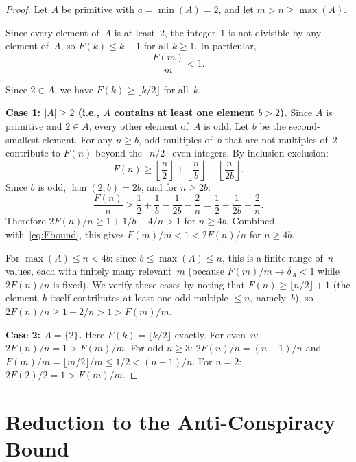 \documentclass[11pt,a4paper]{amsart}
\theoremstyle{plain}
\theoremstyle{definition}
\newcommand{\lcmop}{\operatorname{lcm}}
\begin{document}
\begin{proof}
Let $A$ be primitive with $a = \min(A) = 2$, and let $m > n \geq \max(A)$.

Since every element of~$A$ is at least~$2$, the integer~$1$ is not 
divisible by any element of~$A$, so $F(k) \leq k - 1$ for all $k \geq 1$. 
In particular,
\begin{equation}\label{eq:Fbound}
\frac{F(m)}{m} < 1.
\end{equation}

Since $2 \in A$, we have $F(k) \geq \lfloor k/2 \rfloor$ for all~$k$.

\smallskip
\noindent\textbf{Case 1: $|A| \geq 2$ (i.e., $A$ contains at least one element $b > 2$).}
Since $A$ is primitive and $2 \in A$, every other element of~$A$ is odd. 
Let $b$ be the second-smallest element. For any $n \geq b$, odd multiples 
of~$b$ that are not multiples of~$2$ contribute to $F(n)$ beyond the 
$\lfloor n/2 \rfloor$ even integers. By inclusion-exclusion:
\[
F(n) \geq \left\lfloor \frac{n}{2} \right\rfloor 
+ \left\lfloor \frac{n}{b} \right\rfloor 
- \left\lfloor \frac{n}{2b} \right\rfloor.
\]
Since $b$ is odd, $\lcmop(2,b) = 2b$, and for $n \geq 2b$:
\[
\frac{F(n)}{n} \geq \frac{1}{2} + \frac{1}{b} - \frac{1}{2b} - \frac{2}{n}
= \frac{1}{2} + \frac{1}{2b} - \frac{2}{n}.
\]
Therefore $2F(n)/n \geq 1 + 1/b - 4/n > 1$ for $n \geq 4b$. 
Combined with~\eqref{eq:Fbound}, this gives $F(m)/m < 1 < 2F(n)/n$ for 
$n \geq 4b$.

For $\max(A) \leq n < 4b$: since $b \leq \max(A) \leq n$, this is a finite 
range of~$n$ values, each with finitely many relevant~$m$ (because 
$F(m)/m \to \delta_A < 1$ while $2F(n)/n$ is fixed). We verify these 
cases by noting that $F(n) \geq \lfloor n/2 \rfloor + 1$ (the element~$b$ 
itself contributes at least one odd multiple $\leq n$, namely~$b$), so 
$2F(n)/n \geq 1 + 2/n > 1 > F(m)/m$.

\smallskip
\noindent\textbf{Case 2: $A = \{2\}$.}
Here $F(k) = \lfloor k/2 \rfloor$ exactly. For even~$n$: 
$2F(n)/n = 1 > F(m)/m$. For odd $n \geq 3$: $2F(n)/n = (n-1)/n$ and 
$F(m)/m = \lfloor m/2 \rfloor / m \leq 1/2 < (n-1)/n$. 
For $n = 2$: $2F(2)/2 = 1 > F(m)/m$.
\end{proof}

\section{Reduction to the Anti-Conspiracy Bound}
\end{document}
